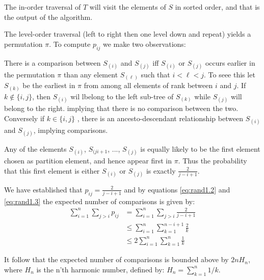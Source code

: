 The in-order traversal of $T$ will visit the elements of $S$ in sorted order,
and that is the output of the algorithm.

The level-order traversal (left to right then one level down and repeat) yields
a permutation $\pi$.  To compute $p_{ij}$ we make two observations:
\begin{enumerate*}
\item There is a comparison between $S_{(i)}$ and $S_{(j)}$ iff $S_{(i)}$ or
  $S_{(j)}$ occurs earlier in the permutation $\pi$ than any element
  $S_{(\ell)}$ such that $i < \ell < j$. To seee this let $S_{(k)}$ be the
  earliest in $\pi$ from among all elements of rank between $i$ and $j$.  If $k
  \notin \{ i,j \}$, then $S_{(i)}$ wil lbelong to the left sub-tree of
  $S_{(k)}$ while $S_{(j)}$ will belong to the right. implying that there is no
  comparison between the two.  Conversely if $k \in \{i,j\}$ , there is an
  ancesto-descendant relationship between $S_{(i)}$ and $S_{(j)}$, implying
  comparisons.

\item Any of the elements $S_{(i)}$, $S_{(ji+1}$, ..., $S_{(j)}$ is equally
  likely to be the first element chosen as partition element, and hence appear
  first in $\pi$.  Thus the probability that this first element is either
  $S_{(i)}$ or $S_{(j)}$ is exactly $\frac{2}{j-i+1}$.
\end{enumerate*}

We have established that $p_{ij} = \frac{2}{j-i+1}$ and by equations \ref{eq:rand1.2} and \ref{eq:rand1.3} the expected number of comparisons is given by:
\begin{align*}
\sum^n_{i=1} \sum_{j>i} p_{ij} &= \sum^n_{i=1} \sum_{j>i} \frac{2}{j-i+1} \\
 &\leq \sum^n_{i=1} \sum^{n-i+1}_{k=1} \frac{2}{k} \\
 &\leq 2\sum^n_{i=1} \sum^{n}_{k=1} \frac{1}{k}
\end{align*}

It follow that the expected number of comparisons is bounded above by $2nH_n$, where $H_n$ is the n'th harmonic number, defined by: $H_n = \sum^n_{k=1} 1/k$.
